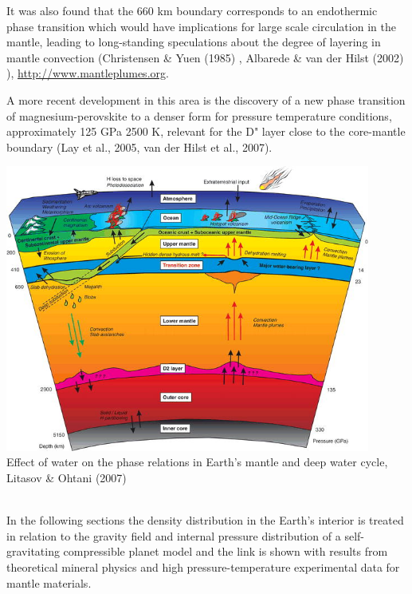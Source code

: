 It was also found that the 660 km boundary corresponds to an
endothermic phase transition which would have implications for 
large scale circulation in the mantle, leading to long-standing 
speculations about the degree of layering in mantle convection
(Christensen \& Yuen (1985) \cite{chyu85},
Albarede \& van der Hilst (2002) \cite{alva02}), \url{http://www.mantleplumes.org}.

A more recent development in this area is the discovery of a new phase
transition of magnesium-perovskite to a denser form for pressure
temperature conditions, approximately 125 GPa 2500 K, relevant for the D"
layer close to the core-mantle boundary
(Lay et al., 2005, van der Hilst et al., 2007).

\begin{center}
\includegraphics[width=12cm]{images/gravity/effect}\\
{\captionfont Effect of water on the phase relations in Earth's mantle and deep water cycle,\\
Litasov \& Ohtani (2007) \cite{lioh07}} 
\end{center}


~\\
In the following sections the density distribution in the
Earth's interior is treated in relation to the gravity field
and internal pressure distribution of a self-gravitating compressible
planet model and the link is shown with results from theoretical
mineral physics and high pressure-temperature experimental data for
mantle materials.
